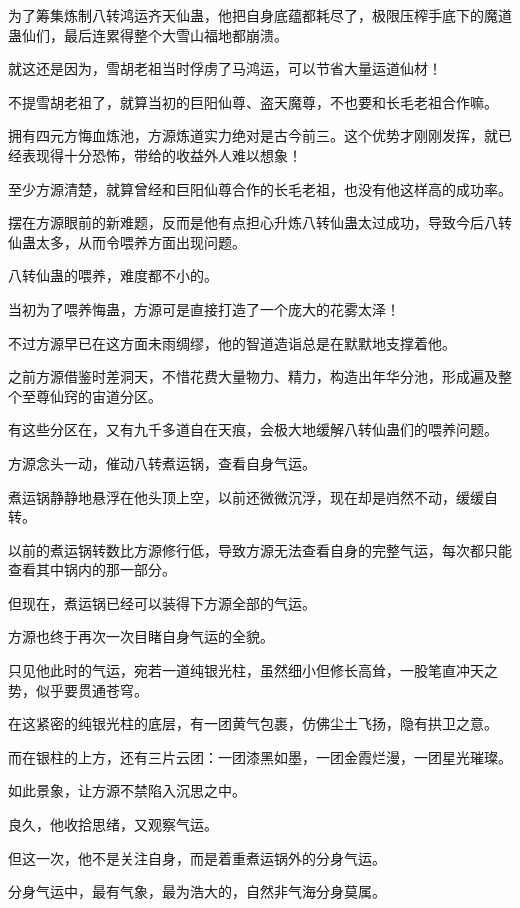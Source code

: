\begin{this_body}
为了筹集炼制八转鸿运齐天仙蛊，他把自身底蕴都耗尽了，极限压榨手底下的魔道蛊仙们，最后连累得整个大雪山福地都崩溃。

就这还是因为，雪胡老祖当时俘虏了马鸿运，可以节省大量运道仙材！

不提雪胡老祖了，就算当初的巨阳仙尊、盗天魔尊，不也要和长毛老祖合作嘛。

拥有四元方悔血炼池，方源炼道实力绝对是古今前三。这个优势才刚刚发挥，就已经表现得十分恐怖，带给的收益外人难以想象！

至少方源清楚，就算曾经和巨阳仙尊合作的长毛老祖，也没有他这样高的成功率。

摆在方源眼前的新难题，反而是他有点担心升炼八转仙蛊太过成功，导致今后八转仙蛊太多，从而令喂养方面出现问题。

八转仙蛊的喂养，难度都不小的。

当初为了喂养悔蛊，方源可是直接打造了一个庞大的花雾太泽！

不过方源早已在这方面未雨绸缪，他的智道造诣总是在默默地支撑着他。

之前方源借鉴时差洞天，不惜花费大量物力、精力，构造出年华分池，形成遍及整个至尊仙窍的宙道分区。

有这些分区在，又有九千多道自在天痕，会极大地缓解八转仙蛊们的喂养问题。

方源念头一动，催动八转煮运锅，查看自身气运。

煮运锅静静地悬浮在他头顶上空，以前还微微沉浮，现在却是岿然不动，缓缓自转。

以前的煮运锅转数比方源修行低，导致方源无法查看自身的完整气运，每次都只能查看其中锅内的那一部分。

但现在，煮运锅已经可以装得下方源全部的气运。

方源也终于再次一次目睹自身气运的全貌。

只见他此时的气运，宛若一道纯银光柱，虽然细小但修长高耸，一股笔直冲天之势，似乎要贯通苍穹。

在这紧密的纯银光柱的底层，有一团黄气包裹，仿佛尘土飞扬，隐有拱卫之意。

而在银柱的上方，还有三片云团：一团漆黑如墨，一团金霞烂漫，一团星光璀璨。

如此景象，让方源不禁陷入沉思之中。

良久，他收拾思绪，又观察气运。

但这一次，他不是关注自身，而是着重煮运锅外的分身气运。

分身气运中，最有气象，最为浩大的，自然非气海分身莫属。


\end{this_body}
